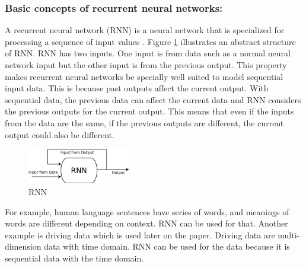 \documentclass[draft,dvipsnames]{drexel-thesis}
\begin{document}
\begin{thesis}
\subsubsection{Basic concepts of recurrent neural networks:}\label{basicRNN}
	A recurrent neural network (RNN) is a neural network that is specialized for processing a sequence of input values \cite{Goodfellow-et-al-2016}. Figure \ref{fig:RNN} illustrates an abstract structure of RNN. RNN has two inputs. One input is from data such as a normal neural network input but the other input is from the previous output. This property makes recurrent neural networks be specially well suited to model sequential input data. This is because past outputs affect the current output. With sequential data, the previous data can affect the current data and RNN considers the previous outputs for the current output. This means that even if the inputs from the data are the same, if the previous outputs are different, the current output could also be different.

\begin{figure}[t!]
    \centering
    \includegraphics[width=0.4\textwidth]{pictures/figures/RNN.png}
    \caption{RNN}
    \label{fig:RNN}
\end{figure}

	For example, human language sentences have series of words, and meanings of words are different depending on context. RNN can be used for that. Another example is driving data which is used later on the paper.  Driving data are multi-dimension data with time domain. RNN can be used for the data because it is sequential data with the time domain.


\end{thesis}
\end{document}
